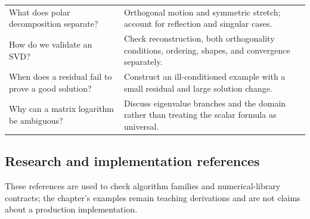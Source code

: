 {\begin{longtable}[]{@{}
  >{\raggedright\arraybackslash}p{}
  >{\raggedright\arraybackslash}p{}@{}}
What does polar decomposition separate? & Orthogonal motion and symmetric stretch; account for reflection and singular cases. \\
How do we validate an SVD? & Check reconstruction, both orthogonality conditions, ordering, shapes, and convergence separately. \\
When does a residual fail to prove a good solution? & Construct an ill-conditioned example with a small residual and large solution change. \\
Why can a matrix logarithm be ambiguous? & Discuss eigenvalue branches and the domain rather than treating the scalar formula as universal. \\
\end{longtable}
}

\subsection{Research and implementation references}\label{02-foundations-ii-ch039-research-and-implementation-references}

\hypertarget{02-foundations-ii-ch039-research-and-implementation-references}{}

These references are used to check algorithm families and numerical-library contracts; the chapter's examples remain teaching derivations and are not claims about a production implementation.

